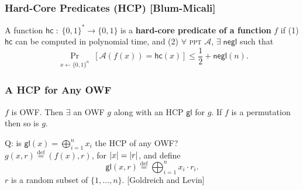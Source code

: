 \begin{frame}\frametitle{Hard-Core Predicates (HCP) [Blum-Micali]}
\begin{figure}
\begin{center}

\end{center}
\end{figure}
\begin{definition}
A function $\mathsf{hc}\; : \; \{0,1\}^* \to \{0,1\}$ is a \textbf{hard-core predicate of a function} $f$ if (1) $\mathsf{hc}$ can be computed in polynomial time, and (2) $\forall$ \textsc{ppt} $\mathcal{A}$, $\exists\; \mathsf{negl}$ such that
\[ \Pr_{\substack{x \gets \{0,1\}^n}}[\mathcal{A}(f(x)) = \mathsf{hc}(x)] \le \frac{1}{2} + \mathsf{negl}(n). \]
\end{definition}
\end{frame}
\begin{frame}\frametitle{A HCP for Any OWF}
\begin{theorem}
$f$ is OWF. Then $\exists$ an OWF $g$ along with an HCP $\mathsf{gl}$ for $g$. If $f$ is a permutation then so is $g$.
\end{theorem}
\alert{Q: is $\mathsf{gl}(x) = \bigoplus^{n}_{i=1} x_i$ the HCP of any OWF?}\\

$g(x,r) \overset{\text{def}}{=} (f(x), r)$, for $\lvert x\rvert = \lvert r\rvert$, and define
\[ \mathsf{gl}(x,r) \overset{\text{def}}{=} \bigoplus^{n}_{i=1} x_i \cdot r_i. \]
$r$ is a random subset of $\{ 1,\dotsc, n \}$. [Goldreich and Levin]
\end{frame}
